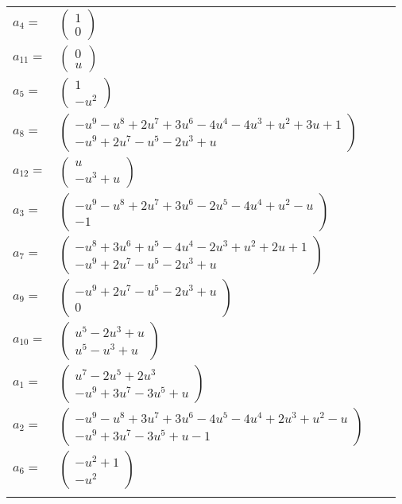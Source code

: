 \documentclass[1p]{elsarticle_modified}
\theoremstyle{definition}
\begin{document}
\begin{tabular}{m{7pt} m{180pt} m{7pt} m{180pt} }
\flushright $a_{4}=$&$\begin{pmatrix}1\\0\end{pmatrix}$ \\
\flushright $a_{11}=$&$\begin{pmatrix}0\\u\end{pmatrix}$ \\
\flushright $a_{5}=$&$\begin{pmatrix}1\\- u^2\end{pmatrix}$ \\
\flushright $a_{8}=$&$\begin{pmatrix}- u^9- u^8+2 u^7+3 u^6-4 u^4-4 u^3+u^2+3 u+1\\- u^9+2 u^7- u^5-2 u^3+u\end{pmatrix}$ \\
\flushright $a_{12}=$&$\begin{pmatrix}u\\- u^3+u\end{pmatrix}$ \\
\flushright $a_{3}=$&$\begin{pmatrix}- u^9- u^8+2 u^7+3 u^6-2 u^5-4 u^4+u^2- u\\-1\end{pmatrix}$ \\
\flushright $a_{7}=$&$\begin{pmatrix}- u^8+3 u^6+u^5-4 u^4-2 u^3+u^2+2 u+1\\- u^9+2 u^7- u^5-2 u^3+u\end{pmatrix}$ \\
\flushright $a_{9}=$&$\begin{pmatrix}- u^9+2 u^7- u^5-2 u^3+u\\0\end{pmatrix}$ \\
\flushright $a_{10}=$&$\begin{pmatrix}u^5-2 u^3+u\\u^5- u^3+u\end{pmatrix}$ \\
\flushright $a_{1}=$&$\begin{pmatrix}u^7-2 u^5+2 u^3\\- u^9+3 u^7-3 u^5+u\end{pmatrix}$ \\
\flushright $a_{2}=$&$\begin{pmatrix}- u^9- u^8+3 u^7+3 u^6-4 u^5-4 u^4+2 u^3+u^2- u\\- u^9+3 u^7-3 u^5+u-1\end{pmatrix}$ \\
\flushright $a_{6}=$&$\begin{pmatrix}- u^2+1\\- u^2\end{pmatrix}$\\&\end{tabular}
\end{document}
